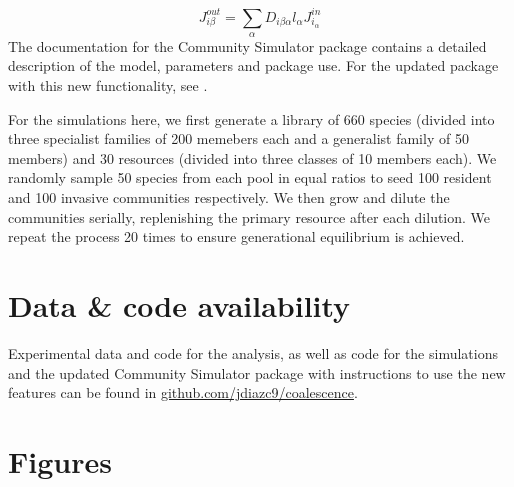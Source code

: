 \documentclass[a4paper,10pt]{article}
\begin{document}
\begin{equation}
J^{out}_{i\beta} = \sum_\alpha D_{i\beta\alpha} l_\alpha J^{in}_{i_\alpha}
\label{eq:jout}
\end{equation}
%
The documentation for the Community Simulator package contains a detailed
description of the model, parameters and package use. For the updated package with
this new functionality, see .

For the simulations here,
we first generate a library of 660 species (divided into three specialist
families of 200 memebers each
and a generalist family of 50 members)
and 30 resources (divided into three classes of 10 members each).
We randomly sample 50 species from each pool in equal ratios to seed
100 resident and
100 invasive communities respectively.
We then grow and dilute the communities serially,
replenishing the primary
resource after each dilution.
We repeat the process 20 times to ensure generational equilibrium is
achieved.

\section{Data \& code availability}\label{datacode}

Experimental data and code for the analysis, as well as code for the simulations
and the updated Community Simulator package with instructions to use the
new features can be found in \url{github.com/jdiazc9/coalescence}.

\section{Figures}\label{figs}

\clearpage

%

\end{document}
